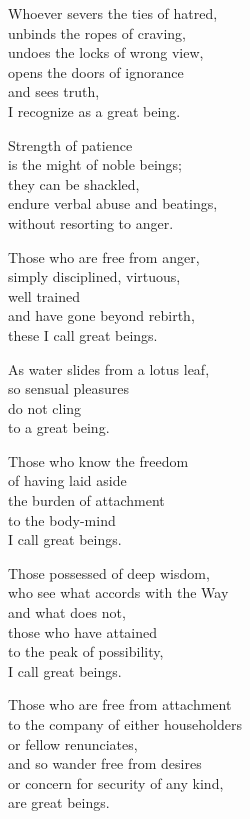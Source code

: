 Whoever severs the ties of hatred,\\
unbinds the ropes of craving,\\
undoes the locks of wrong view,\\
opens the doors of ignorance\\
and sees truth,\\
I recognize as a great being.


Strength of patience\\
is the might of noble beings;\\
they can be shackled,\\
endure verbal abuse and beatings,\\
without resorting to anger.


Those who are free from anger,\\
simply disciplined, virtuous,\\
well trained\\
and have gone beyond rebirth,\\
these I call great beings.


As water slides from a lotus leaf,\\
so sensual pleasures\\
do not cling\\
to a great being.


Those who know the freedom\\
of having laid aside\\
the burden of attachment\\
to the body-mind\\
I call great beings.


Those possessed of deep wisdom,\\
who see what accords with the Way\\
and what does not,\\
those who have attained\\
to the peak of possibility,\\
I call great beings.


Those who are free from attachment\\
to the company of either householders\\
or fellow renunciates,\\
and so wander free from desires\\
or concern for security of any kind,\\
are great beings.


